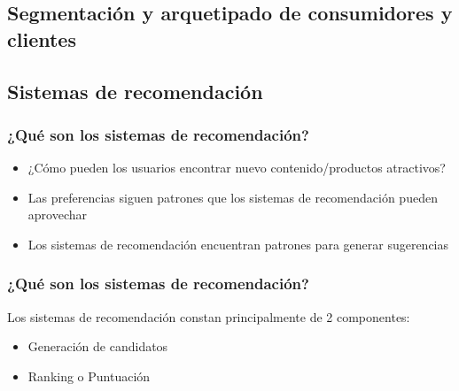 \documentclass[
  shownotes,
  xcolor={svgnames},
  hyperref={colorlinks,citecolor=DarkBlue,linkcolor=Black,urlcolor=DarkBlue}
  , aspectratio=169]{beamer}
\begin{document}
\subsection{Segmentación y arquetipado de consumidores y clientes}
\subsection{Sistemas de recomendación}
\begin{frame}
\frametitle{¿Qué son los sistemas de recomendación?}


\begin{itemize}
    \item ¿Cómo pueden  los usuarios encontrar nuevo contenido/productos atractivos?
    \medskip
    \item Las preferencias siguen patrones que los sistemas de recomendación pueden aprovechar
    \medskip
    \item Los sistemas de recomendación  encuentran patrones para generar sugerencias

    \medskip
    \end{itemize}    
    

\end{frame}
    
    
\begin{frame}
\frametitle{¿Qué son los sistemas de recomendación?}

Los sistemas de recomendación constan principalmente de 2 componentes:
\medskip

\begin{itemize}
    \item Generación de candidatos
    \medskip
    \item Ranking o Puntuación
\end{itemize}

\end{frame}
\end{document}

